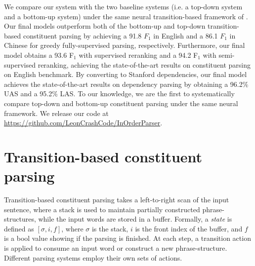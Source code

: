 \documentclass[11pt,letterpaper]{article}
\begin{document}
We compare our system with the two baseline systems (i.e. a top-down system and a bottom-up system) under the same neural transition-based framework of . 
Our final models outperform both of the bottom-up and top-down transition-based constituent parsing by achieving a 91.8 $F_1$ in English and a 86.1 $F_1$ in Chinese for greedy fully-supervised parsing, respectively.
Furthermore, our final model obtains a 93.6 F$_1$ with supervised reranking \cite{choe:2016} and a 94.2 F$_1$ with semi-supervised reranking, achieving the state-of-the-art results on constituent parsing on English benchmark.
By converting to Stanford dependencies, our final model achieves the state-of-the-art results on dependency parsing by obtaining a 96.2\% UAS and a 95.2\% LAS.
To our knowledge, we are the first to systematically compare top-down and bottom-up constituent parsing under the same neural framework.
We release our code at \url{https://github.com/LeonCrashCode/InOrderParser}.

\section{Transition-based constituent parsing}
Transition-based constituent parsing takes a left-to-right scan of the input sentence, where a stack is used to maintain partially constructed phrase-structures, while the input words are stored in a buffer.
Formally, a \textit{state} is defined as $[\sigma, i, f]$, where $\sigma$ is the stack, $i$ is the front index of the buffer, and $f$ is a bool value showing if the parsing is finished.
At each step, a transition action is applied to consume an input word or construct a new phrase-structure.
Different parsing systems employ their own sets of actions.
\end{document}
